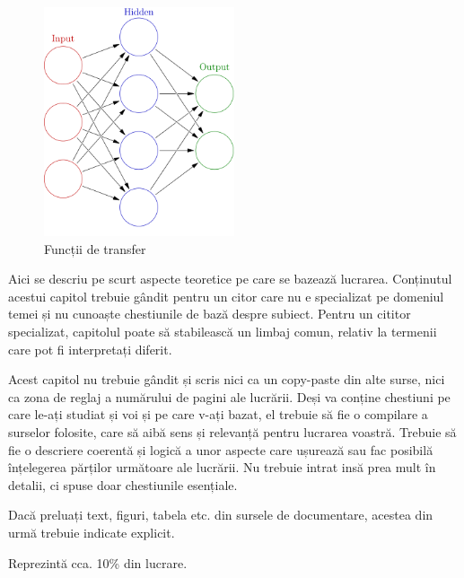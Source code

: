 \begin{figure}[h!]
    	\centering
	\captionsetup{justification=centering, margin=2cm}
	\includegraphics[width=0.5\textwidth]{figures/artificialneunet_1hidden.png}
	\caption{Funcții de transfer \cite{arn}}
	\label{fig:activationFunctions}
\end{figure}





\label{cap:fund-teoretice}

Aici se descriu pe scurt aspecte teoretice pe care se bazează lucrarea. Conținutul acestui capitol trebuie gândit pentru un citor care nu e specializat pe domeniul temei și nu cunoaște chestiunile de bază despre subiect. Pentru un cititor specializat, capitolul poate să stabilească un limbaj comun, relativ la termenii care pot fi interpretați diferit. 

Acest capitol nu trebuie gândit și scris nici ca un copy-paste din alte surse, nici ca zona de reglaj a numărului de pagini ale lucrării. Deși va conține chestiuni pe care le-ați studiat și voi și pe care v-ați bazat, el trebuie să fie o compilare a surselor folosite, care să aibă sens și relevanță pentru lucrarea voastră. Trebuie să fie o descriere coerentă și logică a unor aspecte care ușurează sau fac posibilă înțelegerea părților următoare ale lucrării. Nu trebuie intrat insă prea mult în detalii, ci spuse doar chestiunile esențiale. 

Dacă preluați text, figuri, tabela etc. din sursele de documentare, acestea din urmă trebuie indicate explicit. 

Reprezintă cca. 10\% din lucrare.